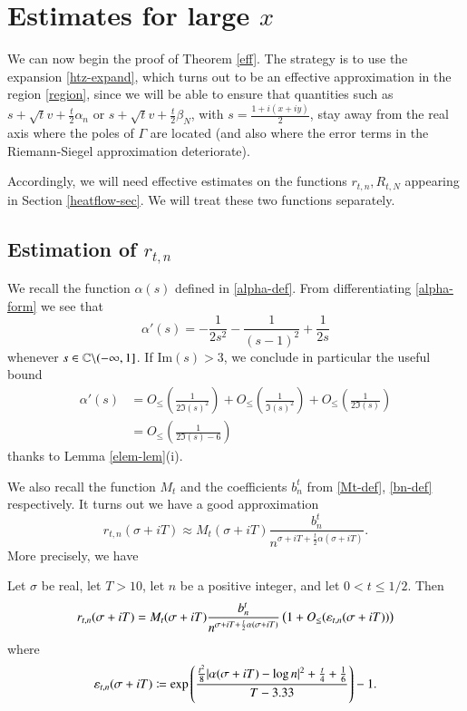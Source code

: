 \section{Estimates for large $x$}\label{initial-sec}

We can now begin the proof of Theorem \ref{eff}.  
The strategy is to use the expansion \eqref{htz-expand}, which turns out to be an effective approximation in the region \eqref{region}, since we will be able to ensure that quantities such as $s + \sqrt{t} v + \frac{t}{2} \alpha_n$ or $s + \sqrt{t} v + \frac{t}{2} \beta_N$, with $s = \frac{1+i(x+iy)}{2}$, stay away from the real axis where the poles of $\Gamma$ are located (and also where the error terms in the Riemann-Siegel approximation deteriorate).  

Accordingly, we will need effective estimates on the functions $r_{t,n}, R_{t,N}$ appearing in Section \ref{heatflow-sec}.  We will treat these two functions separately.

\subsection{Estimation of $r_{t,n}$}

We recall the function $\alpha(s)$ defined in \eqref{alpha-def}.  From differentiating \eqref{alpha-form} we see that
\begin{equation}\label{alpha-deriv}
 \alpha'(s) = -\frac{1}{2s^2} - \frac{1}{(s-1)^2} + \frac{1}{2 s}
\end{equation}
whenever $s \in \mathbb{C} \backslash (-\infty,1]$.  If $\mathrm{Im}(s) > 3$, we conclude in particular the useful bound
\begin{equation}\label{alpha-deriv-bound}
\begin{split}
 \alpha'(s) &= O_{\leq}\left( \frac{1}{2\Im(s)^2} \right) + O_{\leq}\left( \frac{1}{\Im(s)^2} \right) + O_{\leq}\left( \frac{1}{2\Im(s)} \right) \\
 &= O_{\leq}\left( \frac{1}{2 \Im(s)-6} \right)
\end{split}
\end{equation}
thanks to Lemma \ref{elem-lem}(i).  

We also recall the function $M_t$ and the coefficients $b_n^t$ from \eqref{Mt-def}, \eqref{bn-def} respectively.  It turns out we have a good approximation
$$r_{t,n}(\sigma+iT) \approx M_t(\sigma+iT) \frac{b_n^t}{n^{\sigma+iT+\frac{t}{2} \alpha(\sigma+iT)}}.$$
More precisely, we have

\begin{proposition}\label{rtn-prop}  Let $\sigma$ be real, let $T>10$, let $n$ be a positive integer, and let $0 < t \leq 1/2$.  Then 
$$ r_{t,n}(\sigma+iT) = M_t(\sigma+iT) \frac{b_n^t}{n^{\sigma+iT+\frac{t}{2} \alpha(\sigma+iT)}} \left(1 + O_{\leq}(\varepsilon_{t,n}(\sigma+iT))\right)$$
where 
\begin{equation}\label{eps-def}
 \varepsilon_{t,n}(\sigma+iT) \coloneqq \exp\left( \frac{\frac{t^2}{8} |\alpha(\sigma+iT) - \log n|^2 + \frac{t}{4} + \frac{1}{6}}{T-3.33} \right)-1.
\end{equation}
\end{proposition}

